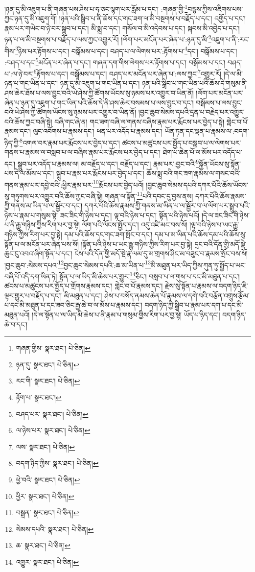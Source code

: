 །ཉན་དུ་མི་འཇུག་པ་ནི་གཞན་པས་ཤེས་པ་ཧ་ཅང་ལྷག་པར་རློམ་པ་དང་། :གཞན་གྱི་\footnote{གཞན་གྱིས་  སྣར་ཐང་།  པེ་ཅིན། }བརྙས་ཀྱིས་འཇིགས་པས་ཀྱང་ཉན་དུ་མི་འཇུག་གོ། །ཉན་པའི་སྒྲིབ་པ་ནི་ཆོས་དང་གང་ཟག་ལ་མི་བསྔགས་པ་བརྗོད་པ་དང་། འགྱོད་པ་དང་། རྣམ་པར་གཡེང་བ་ཉེ་བར་སྒྲུབ་པ་དང་། མི་སྨྲ་བ་དང་། གསོལ་བ་མི་འདེབས་པ་དང་། སྐབས་མི་འབྱེད་པ་དང་། ཉན་པ་ལ་མི་བསྔགས་པ་བརྗོད་པ་ལས་ཀྱང་འགྱུར་རོ། །ལོག་པར་མངོན་པར་ཞེན་པ་:ཉན་དུ་མི་\footnote{ཉན་དུ་  སྣར་ཐང་།  པེ་ཅིན། }འཇུག་པ་ནི་:རང་གིས་\footnote{རང་གི་  སྣར་ཐང་།  པེ་ཅིན། }ཉེས་པར་རྟོགས་པ་དང་། བསྒོམས་པ་དང་། བཤད་པ་ལ་ལེགས་པར་:རྟོགས་པ་\footnote{རྟོག་པ་  སྣར་ཐང་། }དང་། བསྒོམས་པ་དང་། :བཤད་པ་དང་\footnote{བཤད་པར་  སྣར་ཐང་།  པེ་ཅིན། }མངོན་པར་ཞེན་པ་དང་། གཞན་དག་གིས་ལེགས་པར་རྟོགས་པ་དང་། བསྒོམས་པ་དང་། བཤད་པ་:ལ་ཉེ་བར་\footnote{ལ་ཉེས་པར་  སྣར་ཐང་།  པེ་ཅིན། }རྟོགས་པ་དང་། བསྒོམས་པ་དང་། བཤད་པར་མངོན་པར་ཞེན་པ་:ལས་ཀྱང་\footnote{ལས་  སྣར་ཐང་།  པེ་ཅིན། }འགྱུར་རོ། །དེ་ལ་མི་ཉན་པ་གང་ཡིན་པ་དང་། ཉན་དུ་མི་འཇུག་པ་གང་ཡིན་པ་དང་། ཉན་པའི་སྒྲིབ་པ་གང་ཡིན་པའི་ཆོས་དེ་གསུམ་ནི་ཤས་ཆེར་ཐོས་པ་ལས་བྱུང་བའི་ཡེ་ཤེས་ཀྱི་ཚོགས་ཡོངས་སུ་ཉམས་པར་འགྱུར་བ་ཡིན་ནོ། །ལོག་པར་མངོན་པར་ཞེན་པ་ཉན་དུ་འཇུག་པ་གང་ཡིན་པའི་ཆོས་དེ་ནི་ཤས་ཆེར་བསམས་པ་ལས་བྱུང་བ་དང་། བསྒོམས་པ་ལས་བྱུང་བའི་ཡེ་ཤེས་ཀྱི་ཚོགས་ཡོངས་སུ་ཉམས་པར་འགྱུར་བ་ཡིན་ནོ། །བྱང་ཆུབ་སེམས་དཔའི་དྲན་པ་བརྗེད་པར་འགྱུར་བའི་ཆོས་ཀྱང་བཞི་སྟེ། བཞི་གང་ཞེ་ན། གང་ཟག་བཞི་ལ་གནས་བཞིས་རྣམ་པར་རྨོངས་པར་བྱེད་པ་སྟེ། གླེང་བ་པོ་རྣམས་དང་། ལུང་འབོགས་པ་རྣམས་དང་། ཕན་པར་འདོད་པ་རྣམས་དང་། ཡོན་ཏན་དང་ལྡན་པ་རྣམས་ལ་:བདག་ཉིད་ཀྱི་\footnote{བདག་ཉིད་ཀྱིས་  སྣར་ཐང་།  པེ་ཅིན། }འགལ་བར་རྣམ་པར་རྨོངས་པར་བྱེད་པ་དང་། ཚངས་པ་མཚུངས་པར་སྤྱོད་པ་བསླབ་པ་ལ་ལེགས་པར་གནས་པ་རྣམས་ལ་བསླབ་པ་ལ་བཞིས་རྣམ་པར་རྨོངས་པར་བྱེད་པ་དང་། ཐེག་པ་ཆེན་པོ་ལ་མོས་པར་འདོད་པ་དང་། སྒྲུབ་པར་འདོད་པ་རྣམས་ལ། མ་བརྗོད་པ་དང་། བརྗོད་པ་དང་། རྣམ་པར་:བྱང་བའི་\footnote{ཕྱེ་བའི་  སྣར་ཐང་།  པེ་ཅིན། }སྐྱོན་ཡོངས་སུ་སྟོན་པས་དེ་ལ་མོས་པ་དང་། སྒྲུབ་པ་རྣམ་པར་རྨོངས་པར་བྱེད་པ་དང་། ཆོས་སྨྲ་བའི་གང་ཟག་རྣམས་ལ་གསང་བའི་གནས་རྣམ་པར་དབྱེ་བའི་:ཕྱིར་རྣམ་པར་\footnote{ཕྱིར་  སྣར་ཐང་།  པེ་ཅིན། }རྨོངས་པར་བྱེད་པའོ། །བྱང་ཆུབ་སེམས་དཔའི་དཀར་པོའི་ཆོས་ཡོངས་སུ་གཏུགས་པར་འགྱུར་བའི་ཆོས་ཀྱང་བཞི་སྟེ། གཞན་ལ་སྟོན་\footnote{བསྒྲན་  སྣར་ཐང་།  པེ་ཅིན། }པའི་དབང་དུ་བྱས་ནས། དཀར་པོའི་ཆོས་རྣམས་ཀྱི་གནས་མ་ཡིན་པ་ལ་སྦྱོར་བ་དང་། དཀར་པོའི་ཆོས་རྣམས་ཀྱི་གནས་མ་ཡིན་པ་ལ་སྦྱོར་བ་ལ་ལོག་པར་སྒྲུབ་པའི་ཉེས་པ་རྣམ་པ་གསུམ་སྟེ། ཟང་ཟིང་གི་ཉེས་པ་དང་། ལྟ་བའི་ཉེས་པ་དང་། སྟོན་པའི་ཉེས་པའོ། །དེ་ལ་ཟང་ཟིང་གི་ཉེས་པ་ནི་རྒྱུ་གཉིས་ཀྱིས་རིག་པར་བྱ་སྟེ། ལོག་པའི་ལོངས་སྤྱོད་དང་། འདུ་འཛི་མང་བས་སོ། །ལྟ་བའི་ཉེས་པ་ཡང་རྒྱུ་གཉིས་ཀྱིས་རིག་པར་བྱ་སྟེ། དམ་པའི་ཆོས་དང་གང་ཟག་སྤོང་བ་དང་། དམ་པ་མ་ཡིན་པའི་ཆོས་དམ་པའི་ཆོས་སུ་སྟོན་པ་ལ་མངོན་པར་ཞེན་པས་སོ། །སྟོན་པའི་ཉེས་པ་ཡང་རྒྱུ་གཉིས་ཀྱིས་རིག་པར་བྱ་སྟེ། དྲང་བའི་དོན་གྱི་མདོ་སྡེ་ཆུང་ངུ་འབའ་ཞིག་སྟོན་པ་དང་། ངེས་པའི་དོན་གྱི་མདོ་སྡེ་རྣ་ལམ་དུ་མ་གྲགས་ཤིང་མ་བཟུང་བ་རྣམས་སྤོང་བས་སོ། །བྱང་ཆུབ་:སེམས་དཔའ་\footnote{སེམས་དཔའི་  སྣར་ཐང་།  པེ་ཅིན། }བྱང་ཆུབ་སེམས་དཔའི་:ཆ་མ་ཡིན་པ་\footnote{ཆ་  སྣར་ཐང་།  པེ་ཅིན། }མི་མཐུན་པར་ཡིད་ཀྱིས་ཀུན་ཏུ་སྤྱོད་པ་ཡང་བཞི་པོ་འདི་དག་ཡིན་ཏེ། སྟོན་པ་ལ་ཡིད་མི་ཆེས་པར་གྱུར་\footnote{འགྱུར་  སྣར་ཐང་།  པེ་ཅིན། }ཅིང་། བསླབ་པ་ལ་གུས་པ་དང་མི་མཐུན་པ་དང་། ཚངས་པ་མཚུངས་པར་སྤྱོད་པ་གྲོགས་རྣམས་དང་། གླེང་བ་པོ་རྣམས་དང་། རྗེས་སུ་སྟོན་པ་རྣམས་ལ་བདག་ཉིད་ཇི་ལྟར་གྱུར་པ་བརྗོད་པ་དང་། མི་མཐུན་པ་དང་། ཤེས་པ་བསོད་ནམས་ཆེན་པོ་རྣམས་ལ་དགེ་བའི་བརྩོན་འགྲུས་རྩོམ་པ་དང་མི་མཐུན་པ་དང་ཟབ་ཅིང་རྒྱ་ཆེ་བ་ལ་མོས་པ་རྣམས་དང་། བདག་ཉིད་ཀྱི་སྒྲིབ་པ་རྣམ་པར་དག་པ་དང་མི་མཐུན་པའོ། །དེ་ལ་སྟོན་པ་ལ་ཡིད་མི་ཆེས་པ་ནི་རྣམ་པ་གསུམ་གྱིས་རིག་པར་བྱ་སྟེ། ཡོད་པ་ཉིད་དང་། བདག་ཉིད་ཆེ་བ་དང་། 